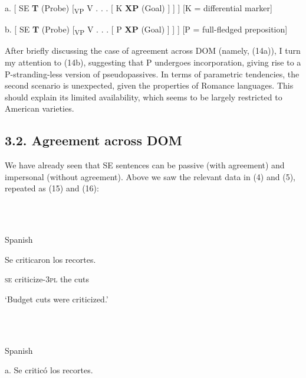 \documentclass[output=paper]{langsci/langscibook}
\begin{document}
\ea%
    \label{ex:key:14}
    \gll\\
        \\
    \glt
    \z

          a.   [ SE \textbf{T} (Probe)  [\textsubscript{VP} V . . . [ K \textbf{XP} (Goal) ] ] ]  [K = differential marker]

 

  b.   [ SE \textbf{T} (Probe)  [\textsubscript{VP} V . . . [ P \textbf{XP} (Goal) ] ] ]  [P = full-fledged preposition]

 

After briefly discussing the case of agreement across DOM (namely, (14a)), I turn my attention to (14b), suggesting that P undergoes incorporation, giving rise to a P-stranding-less version of pseudopassives. In terms of parametric tendencies, the second scenario is unexpected, given the properties of Romance languages. This should explain its limited availability, which seems to be largely restricted to American varieties.

\subsection{ 3.2. Agreement across DOM}

We have already seen that SE sentences can be passive (with agreement) and impersonal (without agreement). Above we saw the relevant data in (4) and (5), repeated as (15) and (16):

\ea%
    \label{ex:key:15}
    \gll\\
        \\
    \glt
    \z

          Spanish

Se  criticaron        los recortes.            

  \textsc{se} criticize\textsc{{}-3pl}  the cuts

            ‘Budget cuts were criticized.’

\ea%
    \label{ex:key:16}
    \gll\\
        \\
    \glt
    \z

          Spanish

a.   Se   criticó             los  recortes.            
\end{document}
